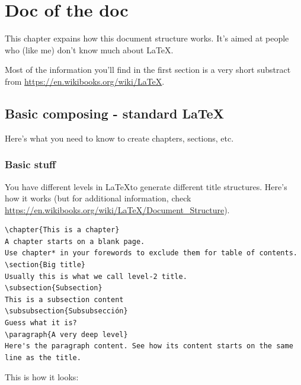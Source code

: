\chapter{Doc of the doc}
\label{chapter:autodoc}

This chapter expains how this document structure works.
It's aimed at people who (like me) don't know much about \LaTeX.

Most of the information you'll find in the first section is a very short
substract from \url{https://en.wikibooks.org/wiki/LaTeX}.

\section{Basic composing - standard \LaTeX}

Here's what you need to know to create chapters, sections, etc.

\subsection{Basic stuff}


You have different levels in \LaTeX to generate different title structures. Here's how it works (but for additional information, check \url{https://en.wikibooks.org/wiki/LaTeX/Document_Structure}).

\begin{lstlisting}[style=Latex-color]
\chapter{This is a chapter}
A chapter starts on a blank page.
Use chapter* in your forewords to exclude them for table of contents.
\section{Big title}
Usually this is what we call level-2 title.
\subsection{Subsection}
This is a subsection content
\subsubsection{Subsubsección}
Guess what it is?
\paragraph{A very deep level}
Here's the paragraph content. See how its content starts on the same line as the title.
\end{lstlisting}
This is how it looks:

